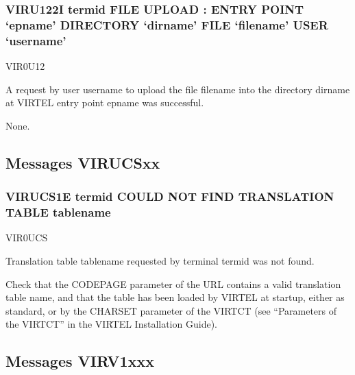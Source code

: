 \documentclass[letterpaper,10pt,english]{sphinxmanual}
\begin{document}
\subsubsection{VIRU122I termid FILE UPLOAD : ENTRY POINT ‘epname’ DIRECTORY ‘dirname’ FILE ‘filename’ USER ‘username’}
\label{\detokenize{messages:viru122i-termid-file-upload-entry-point-epname-directory-dirname-file-filename-user-username}}\begin{description}
\sphinxAtStartPar
VIR0U12

\sphinxAtStartPar
A request by user username to upload the file filename into the directory dirname at VIRTEL entry point epname was successful.

\sphinxAtStartPar
None.

\end{description}


\subsection{Messages VIRUCSxx}
\label{\detokenize{messages:messages-virucsxx}}

\subsubsection{VIRUCS1E termid COULD NOT FIND TRANSLATION TABLE tablename}
\label{\detokenize{messages:virucs1e-termid-could-not-find-translation-table-tablename}}\begin{description}
\sphinxAtStartPar
VIR0UCS

\sphinxAtStartPar
Translation table tablename requested by terminal termid was not found.

\sphinxAtStartPar
Check that the CODEPAGE parameter of the URL contains a valid translation table name, and that the table has been loaded by VIRTEL at startup, either as standard, or by the CHARSET parameter of the VIRTCT (see “Parameters of the VIRTCT” in the VIRTEL Installation Guide).

\end{description}


\subsection{Messages VIRV1xxx}
\label{\detokenize{messages:messages-virv1xxx}}
\end{document}
